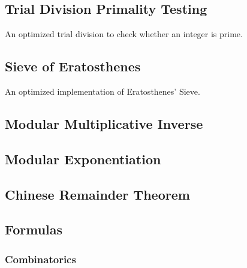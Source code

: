 \documentclass[10pt,a4paper,titlepage]{article}
\begin{document}
\subsection{Trial Division Primality Testing}
An optimized trial division to check whether an integer is prime.


\subsection{Sieve of Eratosthenes}
An optimized implementation of Eratosthenes' Sieve.


\subsection{Modular Multiplicative Inverse}


\subsection{Modular Exponentiation}


\subsection{Chinese Remainder Theorem}


\subsection{Formulas}

\subsubsection{Combinatorics}
\end{document}
